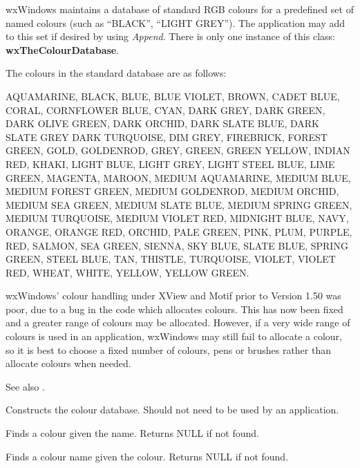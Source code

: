 wxWindows maintains a database of standard RGB colours for a predefined
set of named colours (such as ``BLACK'', ``LIGHT GREY''). The
application may add to this set if desired by using {\it Append}.  There
is only one instance of this class: {\bf wxTheColourDatabase}.

The colours in the standard database are as follows:

AQUAMARINE, BLACK, BLUE, BLUE VIOLET, BROWN, CADET BLUE, CORAL,
CORNFLOWER BLUE, CYAN, DARK GREY, DARK GREEN, DARK OLIVE GREEN, DARK
ORCHID, DARK SLATE BLUE, DARK SLATE GREY DARK TURQUOISE, DIM GREY,
FIREBRICK, FOREST GREEN, GOLD, GOLDENROD, GREY, GREEN, GREEN YELLOW,
INDIAN RED, KHAKI, LIGHT BLUE, LIGHT GREY, LIGHT STEEL BLUE, LIME GREEN,
MAGENTA, MAROON, MEDIUM AQUAMARINE, MEDIUM BLUE, MEDIUM FOREST GREEN,
MEDIUM GOLDENROD, MEDIUM ORCHID, MEDIUM SEA GREEN, MEDIUM SLATE BLUE,
MEDIUM SPRING GREEN, MEDIUM TURQUOISE, MEDIUM VIOLET RED, MIDNIGHT BLUE,
NAVY, ORANGE, ORANGE RED, ORCHID, PALE GREEN, PINK, PLUM, PURPLE, RED,
SALMON, SEA GREEN, SIENNA, SKY BLUE, SLATE BLUE, SPRING GREEN, STEEL
BLUE, TAN, THISTLE, TURQUOISE, VIOLET, VIOLET RED, WHEAT, WHITE, YELLOW,
YELLOW GREEN.

wxWindows' colour handling under XView and Motif prior to Version 1.50
was poor, due to a bug in the code which allocates colours. This has
now been fixed and a greater range of colours may be allocated.
However, if a very wide range of colours is used in an application,
wxWindows may still fail to allocate a colour, so it is best to choose
a fixed number of colours, pens or brushes rather than allocate
colours when needed.

See also .



Constructs the colour database.  Should not need to be used by an 
application.



Finds a colour given the name.  Returns NULL if not found.



Finds a colour name given the colour. Returns NULL if not found.

